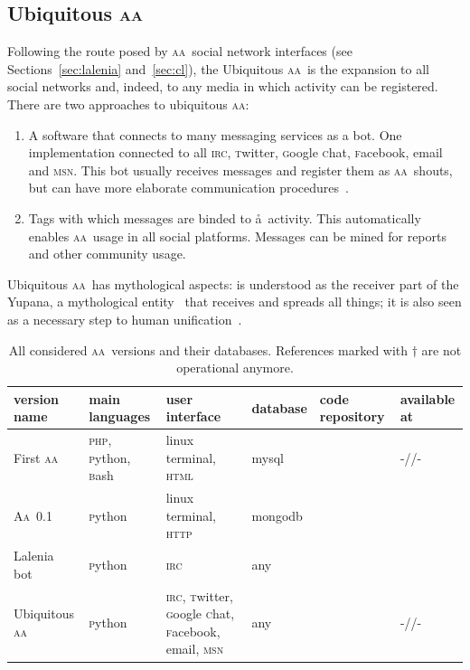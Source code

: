 \documentclass[a4paper, 11pt]{article} %
\newcommand{\php}{\textsc{php}}
\newcommand{\twitter}{\textsc{t}witter}
\newcommand{\facebook}{\textsc{f}acebook}
\newcommand{\msn}{\textsc{msn}}
\newcommand{\gchat}{\textsc{g}oogle \textsc{c}hat}
\newcommand{\bash}{\textsc{b}ash}
\newcommand{\python}{\textsc{p}ython}
\newcommand{\irc}{\textsc{irc}}
\newcommand{\httpb}{\textsc{http}}
\newcommand{\html}{\textsc{html}}
\newcommand{\aab}{\textsc{aa}}
\newcommand{\aai}{\textsc{Aa}}
\newcommand{\mongodb}{{\sc m}ongo{\sc db}}
\newcommand{\mysql}{{\sc m}y{\sc sql}}
\begin{document}
\subsection{Ubiquitous \aab}\label{sec:ubi}
Following the route posed by \aab\ social network interfaces (see Sections~\ref{sec:lalenia} and~\ref{sec:cl}), the Ubiquitous \aab\ is the expansion to all social networks and, indeed, to any media in which activity can be registered. There are two approaches to ubiquitous \aab:
\begin{enumerate}
    \item A software that connects to many messaging services as a bot. One implementation connected to all \irc, \twitter, \gchat, \facebook, email and \msn. This bot usually receives messages and register them as \aab\ shouts, but can have more elaborate communication procedures~\cite{ubiqui}.
    \item Tags with which messages are binded to \aa\ activity. This automatically enables \aab\ usage in all social platforms. Messages can be mined for reports and other community usage.
\end{enumerate}

Ubiquitous \aab\ has mythological aspects: is understood as the receiver part of the Yupana, a mythological entity~\cite{yupana} that receives and spreads all things; it is also seen as a necessary step to human unification~\cite{wisaa}.

\begin{table}[!h]
  \centering
  \caption{All considered \aab\ versions and their databases. References marked with $\dagger$ are not operational anymore.}\label{tab:aas}
  \begin{tabular}{|l|l|p{2cm}|l|l|l|}\hline
      {\bf version name} & {\bf main languages} & {\bf user interface} & {\bf database} & {\bf code repository} & {\bf available at} \\\hline\hline
First \aab & \php, \python, \bash & linux terminal, \html & \mysql & \cite{aafc,aafs} & -//- \\\hline
\aai\ 0.1 & \python & linux terminal, \httpb & \mongodb & \cite{aa01r} & \cite{aa01c,aa01s} \\\hline
Lalenia bot & \python & \irc\ & any &\cite{} & \cite{} \\\hline
Ubiquitous \aab & \python & \irc, \twitter, \gchat, \facebook, email, \msn & any & \url{} & -//- \\\hline
  \end{tabular}
\end{table}
\end{document}
